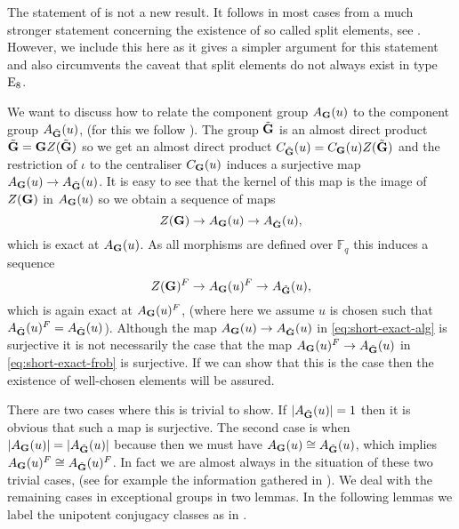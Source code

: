 \documentclass{jt-calcs}
\renewcommand{\cref}{\Cref}
\begin{document}
\begin{rem}
The statement of \cref{thm:triv-comp-action-adj} is not a new result. It follows in most cases from a much stronger statement concerning the existence of so called split elements, see \cite[Remark 5.1]{shoji:1987:green-functions-of-reductive-groups}. However, we include this here as it gives a simpler argument for this statement and also circumvents the caveat that split elements do not always exist in type $\operatorname{E}_8$.
\end{rem}

We want to discuss how to relate the component group $A_{\mathbf{G}}(u)$ to the component group $A_{\tilde{\mathbf{G}}}(u)$, (for this we follow \cite[p.\ 306]{geck:1996:on-the-average-values}). The group $\tilde{\mathbf{G}}$ is an almost direct product $\tilde{\mathbf{G}} = \mathbf{G} Z(\tilde{\mathbf{G}})$ so we get an almost direct product $C_{\tilde{\mathbf{G}}}(u) = C_{\mathbf{G}}(u)Z(\tilde{\mathbf{G}})$ and the restriction of $\iota$ to the centraliser $C_{\mathbf{G}}(u)$ induces a surjective map $A_{\mathbf{G}}(u) \to A_{\tilde{\mathbf{G}}}(u)$. It is easy to see that the kernel of this map is the image of $Z(\mathbf{G})$ in $A_{\mathbf{G}}(u)$ so we obtain a sequence of maps
\begin{equation}\label{eq:short-exact-alg}
Z(\bG) \to A_{\bG}(u) \to A_{\btG}(u),
\end{equation}
which is exact at $A_{\mathbf{G}}(u)$. As all morphisms are defined over $\mathbb{F}_q$ this induces a sequence
\begin{equation}\label{eq:short-exact-frob}
Z(\bG)^F \to A_{\bG}(u)^F \to A_{\btG}(u),
\end{equation}
which is again exact at $A_{\mathbf{G}}(u)^F$, (where here we assume $u$ is chosen such that $A_{\tilde{\mathbf{G}}}(u)^F = A_{\tilde{\mathbf{G}}}(u)$). Although the map $A_{\mathbf{G}}(u) \to A_{\tilde{\mathbf{G}}}(u)$ in \eqref{eq:short-exact-alg} is surjective it is not necessarily the case that the map $A_{\mathbf{G}}(u)^F \to A_{\tilde{\mathbf{G}}}(u)$ in \eqref{eq:short-exact-frob} is surjective. If we can show that this is the case then the existence of well-chosen elements will be assured.

There are two cases where this is trivial to show. If $|A_{\tilde{\mathbf{G}}}(u)| = 1$ then it is obvious that such a map is surjective. The second case is when $|A_{\mathbf{G}}(u)| = |A_{\tilde{\mathbf{G}}}(u)|$ because then we must have $A_{\mathbf{G}}(u) \cong A_{\tilde{\mathbf{G}}}(u)$, which implies $A_{\mathbf{G}}(u)^F \cong A_{\tilde{\mathbf{G}}}(u)^F$. In fact we are almost always in the situation of these two trivial cases, (see for example the information gathered in \cite[Chapter 2]{taylor:2012:thesis}). We deal with the remaining cases in exceptional groups in two lemmas. In the following lemmas we label the unipotent conjugacy classes as in \cite[\S 13.1]{carter:1993:finite-groups-of-lie-type}.
\end{document}
